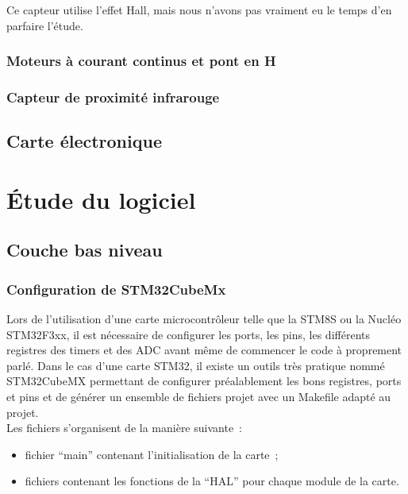 \documentclass{article}
\begin{document}
Ce capteur utilise l'effet Hall, mais nous n'avons pas vraiment eu le temps d'en parfaire l'étude.

\subsubsection{Moteurs à courant continus et pont en H}

\subsubsection{Capteur de proximité infrarouge}

\subsection{Carte électronique}

\section{Étude du logiciel}

\subsection{Couche bas niveau}

\subsubsection{Configuration de STM32CubeMx}

Lors de l'utilisation d'une carte microcontrôleur telle que la STM8S ou la Nucléo STM32F3xx, il est nécessaire de configurer les ports, les pins, les différents registres des timers et des ADC avant même de commencer le code à proprement parlé. Dans le cas d'une carte STM32, il existe un outils très pratique nommé STM32CubeMX permettant de configurer préalablement les bons registres, ports et pins et de générer un ensemble de fichiers projet avec un Makefile adapté au projet. \\

Les fichiers s'organisent de la manière suivante~: \\
\begin{itemize}
  \item fichier ``main'' contenant l'initialisation de la carte~;
  \item fichiers contenant les fonctions de la ``HAL'' pour chaque module de la carte. \\
\end{itemize}
\end{document}

